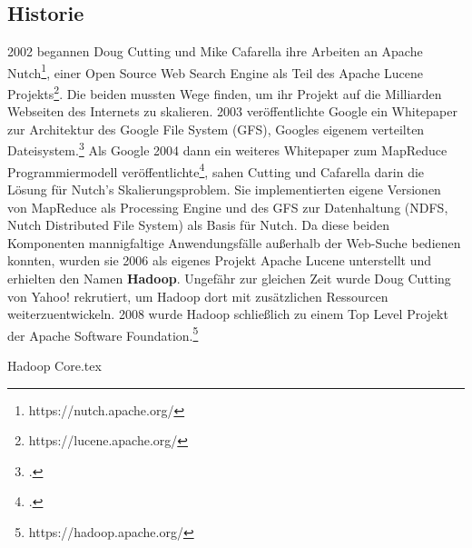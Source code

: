 \subsection{Historie}
2002 begannen Doug Cutting und Mike Cafarella ihre Arbeiten an Apache Nutch\footnote{https://nutch.apache.org/}, einer Open Source Web Search Engine als Teil des Apache Lucene Projekts\footnote{https://lucene.apache.org/}. Die beiden mussten Wege finden, um ihr Projekt auf die Milliarden Webseiten des Internets zu skalieren. 2003 veröffentlichte Google ein Whitepaper zur Architektur des Google File System (GFS), Googles eigenem verteilten Dateisystem.\footcite[The Google File System]{ghemawat_google_2003} Als Google 2004 dann ein weiteres Whitepaper zum MapReduce Programmiermodell veröffentlichte\footcite[MapReduce: Simplified Data Processing on Large Clusters]{dean_mapreduce_2004}, sahen Cutting und Cafarella darin die Lösung für Nutch's Skalierungsproblem. Sie implementierten eigene Versionen von MapReduce als Processing Engine und des GFS zur Datenhaltung (NDFS, Nutch Distributed File System) als Basis für Nutch. Da diese beiden Komponenten mannigfaltige Anwendungsfälle außerhalb der Web-Suche bedienen konnten, wurden sie 2006 als eigenes Projekt Apache Lucene unterstellt und erhielten den Namen \textbf{Hadoop}. Ungefähr zur gleichen Zeit wurde Doug Cutting von Yahoo! rekrutiert, um Hadoop dort mit zusätzlichen Ressourcen weiterzuentwickeln. 2008 wurde Hadoop schließlich zu einem Top Level Projekt der Apache Software Foundation.\footnote{https://hadoop.apache.org/}\cite{cutting_next_2016}

\begin{comment}
\section{Hadoop Versionsverlauf}
\subsection{Hadoop 1.x}
Das NDFS wurde zum Hadoop Distributed File System (HDFS) weiterentwickelt.
MapReduce war die einzige Processing Engine -> Nur große Java Applications
Scheduler der Single Point of Failure und Bottleneck

\subsection{Hadoop 2.x}
YARN als neue Ressourcenverwaltung
Haddop auf Windows
Bottleneck behoben, aber auch Möglichkeit geschaffen, ganz andere Prozesse im Cluster laufen zu lassen
In dem Fall muss man Dateien selbst aufteilen

\subsection{Hadoop 3.x}
Erasure Coding in HDFS
Support for Microsoft Azure Data Lake and Aliyun Object Storage System filesystem connectors
YARN Resource Types
\end{comment}

{Hadoop Core.tex}

